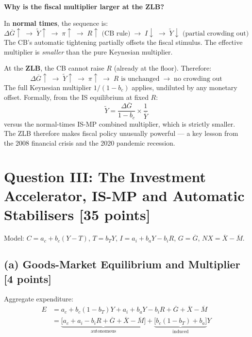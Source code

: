 \documentclass[letterpaper,12pt]{article}
\begin{document}
\textbf{Why is the fiscal multiplier larger at the ZLB?}

In \textbf{normal times}, the sequence is:
\[
\Delta\overline{G} \uparrow \;\to\; \widetilde{Y} \uparrow \;\to\; \pi \uparrow \;\to\; R \uparrow \text{ (CB rule)} \;\to\; I \downarrow \;\to\; \widetilde{Y} \downarrow \text{ (partial crowding out)}
\]
The CB's automatic tightening partially offsets the fiscal stimulus. The effective multiplier is \emph{smaller} than the pure Keynesian multiplier.

At the \textbf{ZLB}, the CB cannot raise $R$ (already at the floor). Therefore:
\[
\Delta\overline{G} \uparrow \;\to\; \widetilde{Y} \uparrow \;\to\; \pi \uparrow \;\to\; R \text{ is unchanged} \;\to\; \text{no crowding out}
\]
The full Keynesian multiplier $1/(1-b_c)$ applies, undiluted by any monetary offset. Formally, from the IS equilibrium at fixed $R$:
\[
\widetilde{Y} = \frac{\Delta\overline{G}}{1-b_c} \times \frac{1}{\overline{Y}}
\]
versus the normal-times IS-MP combined multiplier, which is strictly smaller. The ZLB therefore makes fiscal policy unusually powerful — a key lesson from the 2008 financial crisis and the 2020 pandemic recession.


\section*{Question III: The Investment Accelerator, IS-MP and Automatic Stabilisers [35 points]}

\noindent Model: $C = a_c + b_c(Y-T)$, $T = b_T Y$, $I = a_i + b_a Y - b_i R$, $G = \overline{G}$, $NX = \overline{X}-\overline{M}$.

\subsection*{(a) Goods-Market Equilibrium and Multiplier [4 points]}

Aggregate expenditure:
\begin{align*}
E &= a_c + b_c(1-b_T)Y + a_i + b_a Y - b_i R + \overline{G} + \overline{X} - \overline{M} \\
  &= \underbrace{\bigl[a_c + a_i - b_i R + \overline{G} + \overline{X} - \overline{M}\bigr]}_{\text{autonomous}} + \underbrace{\bigl[b_c(1-b_T) + b_a\bigr]}_{\text{induced}}Y
\end{align*}
\end{document}
